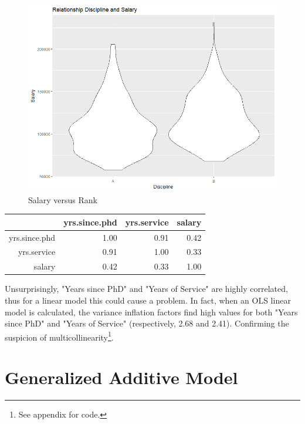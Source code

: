 \documentclass{article}
\begin{document}
\begin{figure}[!htb]
    \centering
    \includegraphics[scale=0.4]{salaryDiscipline}
    \caption{Salary versus Rank}
    \label{pairs5}
\end{figure}

\newpage



\begin{table}[!htb]
\centering
{} \label{t6} 
\begin{tabular}{rrrr}
  \hline
 & yrs.since.phd & yrs.service & salary \\ 
  \hline
yrs.since.phd & 1.00 & 0.91 & 0.42 \\ 
  yrs.service & 0.91 & 1.00 & 0.33 \\ 
  salary & 0.42 & 0.33 & 1.00 \\ 
   \hline
\end{tabular}
\end{table}

Unsurprisingly, "Years since PhD" and "Years of Service" are highly correlated, thus for a linear model this could cause a problem. In fact, when an OLS linear model is calculated, the variance inflation factors find high values for both "Years since PhD" and "Years of Service" (respectively, 2.68 and 2.41). Confirming the suspicion of multicollinearity\footnote{See appendix for code.}. 
\section{Generalized Additive Model}
\end{document}
